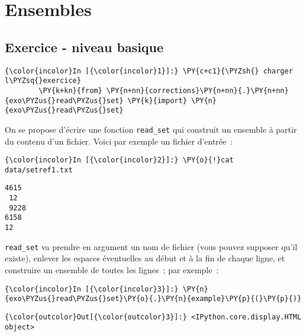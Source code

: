     
    
    
    

    

    \hypertarget{ensembles}{%
\section{Ensembles}\label{ensembles}}

    \hypertarget{exercice---niveau-basique}{%
\subsection{Exercice - niveau basique}\label{exercice---niveau-basique}}

    \begin{Verbatim}[commandchars=\\\{\}]
{\color{incolor}In [{\color{incolor}1}]:} \PY{c+c1}{\PYZsh{} charger l\PYZsq{}exercice}
        \PY{k+kn}{from} \PY{n+nn}{corrections}\PY{n+nn}{.}\PY{n+nn}{exo\PYZus{}read\PYZus{}set} \PY{k}{import} \PY{n}{exo\PYZus{}read\PYZus{}set}
\end{Verbatim}


    On se propose d'écrire une fonction \texttt{read\_set} qui construit un
ensemble à partir du contenu d'un fichier. Voici par exemple un fichier
d'entrée~:

    \begin{Verbatim}[commandchars=\\\{\}]
{\color{incolor}In [{\color{incolor}2}]:} \PY{o}{!}cat data/setref1.txt
\end{Verbatim}


    \begin{Verbatim}[commandchars=\\\{\}]
4615
 12
 9228
6158
12

    \end{Verbatim}

    \texttt{read\_set} va prendre en argument un nom de fichier (vous pouvez
supposer qu'il existe), enlever les espaces éventuelles au début et à la
fin de chaque ligne, et construire un ensemble de toutes les lignes~;
par exemple~:

    \begin{Verbatim}[commandchars=\\\{\}]
{\color{incolor}In [{\color{incolor}3}]:} \PY{n}{exo\PYZus{}read\PYZus{}set}\PY{o}{.}\PY{n}{example}\PY{p}{(}\PY{p}{)}
\end{Verbatim}


\begin{Verbatim}[commandchars=\\\{\}]
{\color{outcolor}Out[{\color{outcolor}3}]:} <IPython.core.display.HTML object>
\end{Verbatim}
            
